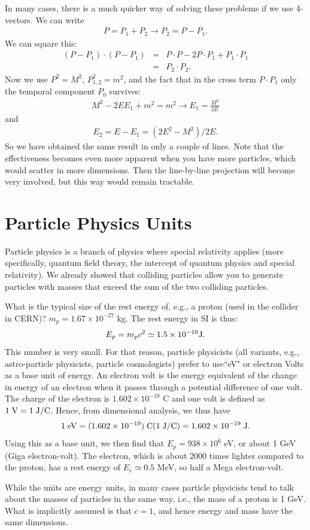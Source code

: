 \documentclass[12pt]{article}
\newcommand{\be}{\begin{eqnarray}}
\newcommand{\ee}{\end{eqnarray}}
\begin{document}
In many cases, there is a much quicker way of solving these problems if we use 4-vectors. We can write 
\be
P = P_1 + P_2 \rightarrow P_2 = P -P_1.
\ee
We can square this:
\be
(P-P_1)\cdot(P-P_1) &=& P\cdot P - 2 P \cdot P_1 + P_1 \cdot P_1\nonumber \\
&=&P_2 \cdot P_2.
\ee
Now we use $P^2 = M^2$, $P_{1,2}^2 = m^2$, and the fact that in the cross term $P\cdot P_1$ only the temporal component $P_0$ survives:
\be
M^2 - 2E E_1+m^2 = m^2 \rightarrow E_1 = \frac{M^2}{2E}
\ee
and 
\be
E_2 = E-E_1 = (2E^2 -M^2)/2E.
\ee
So we have obtained the same result in only a couple of lines. Note that the effectiveness becomes even more apparent when you have more particles, which would scatter in more dimensions. Then the line-by-line projection will become very involved, but this way would remain tractable. 

\section{Particle Physics Units}\label{sec:PPU}
Particle physics is a branch of physics where special relativity applies (more specifically, quantum field theory, the intercept of quantum physics and special relativity). We already showed that colliding particles allow you to generate particles with masses that exceed the sum of the two colliding particles. 

What is the typical size of the rest energy of, e.g., a proton (used in the collider in CERN)? $m_p = 1.67\times 10^{-27}$ kg. The rest energy in SI is thus:
\be
E_p = m_p c^2 \simeq 1.5 \times 10^{-10}{\rm J}.
\ee
This number is very small. For that reason, particle physicists (all variants, e.g., astro-particle physicists, particle cosmologists) prefer to use``eV" or electron Volts as a base unit of energy. An electron volt is the energy equivalent of the change in energy of an electron when it passes through a potential difference of one volt. The charge of the electron is $1.602\times 10^{-19}$ C and one volt is defined as $1\; {\rm V} = 1\;{\rm J/C}$. Hence, from dimensional analysis, we thus have 
\be
1\;{\rm eV} = (1.602 \times 10^{-19})\;{\rm C} (1\; {\rm J/C}) = 1.602 \times 10^{-19}\; {\rm J}.
\ee
Using this as a base unit, we then find that $E_p = 938\times 10^6$ eV, or about 1 GeV (Giga electron-volt). The electron, which is about 2000 times lighter compared to the proton, has a rest energy of $E_e\simeq 0.5 $ MeV, so half a Mega electron-volt. 

While the units are energy units, in many cases particle physicists tend to talk about the masses of particles in the same way, i.e., the mass of a proton is 1 GeV. What is implicitly assumed is that $c=1$, and hence energy and mass have the same dimensions. 
\end{document}

